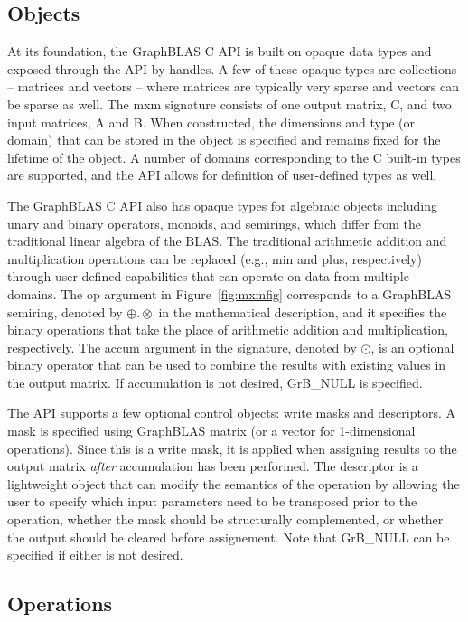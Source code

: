 \subsection{Objects}

At its foundation, the GraphBLAS C API is built on opaque data types and exposed
through the API by handles.  
A few of these opaque types are collections -- matrices and vectors --
where matrices are typically very sparse and vectors can be
sparse as well.  The {\sf mxm} signature consists of one output matrix, {\sf C}, and 
two input matrices, {\sf A} and {\sf B}. When constructed, the dimensions and 
type (or domain) that can 
be stored in the object is specified and remains fixed for the lifetime of 
the object.  A number of domains corresponding to the C built-in types are
supported, and the API allows for definition of user-defined types as well.

The GraphBLAS C API also has opaque types for algebraic objects including
unary and binary operators, monoids, and semirings, which differ from the traditional
linear algebra of the BLAS.  The traditional arithmetic addition and
multiplication operations can be replaced (e.g., min and plus, respectively) through
user-defined capabilities that can operate on data from multiple domains.  The {\sf op} 
argument in Figure~\ref{fig:mxmfig} corresponds to a GraphBLAS semiring, denoted by $\oplus.\otimes$ in the 
mathematical description, and it specifies the binary operations that take the 
place of arithmetic addition and multiplication, respectively. The {\sf accum}
argument in the signature, denoted by $\odot$, is an optional binary operator that can
be used to combine the results with existing values in the output matrix. If accumulation
is not desired, {\sf GrB\_NULL} is specified.

The API supports a few optional control objects: write masks and descriptors.  A
mask is specified using GraphBLAS matrix (or a vector for 1-dimensional operations).
Since this is a write mask, it is applied when assigning results to the output matrix
{\em after} accumulation has been performed.
The descriptor is a lightweight object that can modify the semantics of the
operation by allowing the user to specify which input parameters need to be transposed
prior to the operation, whether the mask should be structurally complemented, or whether
the output should be cleared before assignement.
Note that {\sf GrB\_NULL} can be specified if either is not desired.

\subsection{Operations}

